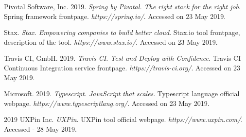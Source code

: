 \documentclass[licencjacka,en]{thesisclass}
\begin{document}
\begin{thebibliography}{99}
        Pivotal Software, Inc. 2019.
        \textit{Spring by Pivotal. The right stack for the right job}.
        Spring framework frontpage.
        \textit{https://spring.io/}.
        Accessed on 23 May 2019.

        Stax.
        \textit{Stax. Empowering companies to build better cloud}.
        Stax.io tool frontpage, description of the tool.
        \textit{https://www.stax.io/}.
        Accessed on 23 May 2019.

        Travis CI, GmbH. 2019.
        \textit{Travis CI. Test and Deploy with Confidence}.
        Travis CI Continuous Integration service frontpage.
        \textit{https://travis-ci.org/}.
        Accessed on 23 May 2019.

        Microsoft. 2019.
        \textit{Typescript. JavaScript that scales}.
        Typescript language official webpage.
        \textit{https://www.typescriptlang.org/}.
        Accessed on 23 May 2019.

        2019 UXPin Inc.
        \textit{UXPin}.
        UXPin tool official webpage.
        \textit{https://www.uxpin.com/}.
        Accessed - 28 May 2019.
        
    \end{thebibliography}
\end{document}
